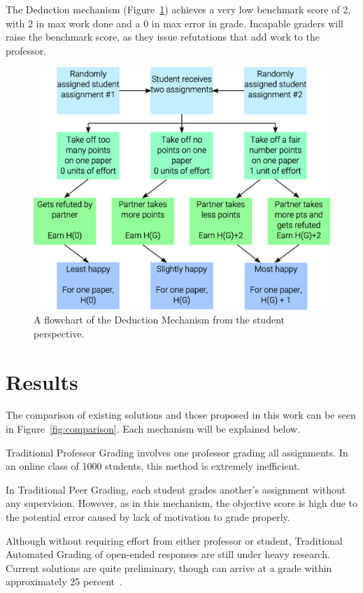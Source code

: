 \documentclass{chi-ext}
\begin{document}
The Deduction mechanism (Figure~\ref{fig:deduction}) achieves a very low benchmark score of 2, with 2 in max work done and a 0 in max error in grade. Incapable graders will raise the benchmark score, as they issue refutations that add work to the professor.

\begin{figure}
  \centering
  \includegraphics[width=\linewidth]{Deduction-Flowchart.eps}
  \caption{A flowchart of the Deduction Mechanism from the student perspective.}
  \label{fig:deduction}
\end{figure}

\section{Results}
The comparison of existing solutions and those proposed in this work can be seen in Figure~\ref{fig:comparison}. Each mechanism will be explained below.

Traditional Professor Grading involves one professor grading all assignments. In an online class of 1000 students, this method is extremely inefficient.

In Traditional Peer Grading, each student grades another's assignment without any supervision. However, as in this mechanism, the objective score is high due to the potential error caused by lack of motivation to grade properly.

Although without requiring effort from either professor or student, Traditional Automated Grading of open-ended responses are still under heavy research. Current solutions are quite preliminary, though can arrive at a grade within approximately 25 percent~\cite{automatedsystemssuck}.
\end{document}
